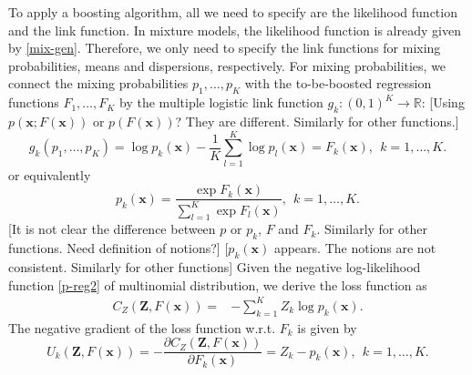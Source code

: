\documentclass[11pt]{article}
\numberwithin{equation}{section}
\def\R{{\mathbb R}}  %
\def\bx{\boldsymbol{x}}
\def\bZ{\boldsymbol{Z}}
\begin{document}
To apply a boosting algorithm, all we need to specify are the likelihood function and the link function.
In mixture models, the likelihood function is already given by \eqref{mix-gen}.
Therefore, we only need to specify the link functions for mixing probabilities, means and dispersions, respectively.
For mixing probabilities, we connect the mixing probabilities $p_1,\ldots,p_K$ with the to-be-boosted regression functions $F_1,\ldots,F_K$ by the multiple logistic link function $g_k:(0,1)^K\rightarrow \R$: {\color{blue}[Using $p(\bx;F(\bx))$ or $p(F(\bx))$? They are different. Similarly for other functions.]}	
	\begin{equation}\label{inv-logistic}
		g_k(p_1,\ldots,p_K)=\log p_k(\bx)-\frac{1}{K}\sum_{l=1}^K\log p_l(\bx)=F_k(\bx),~~k=1,\ldots,K.
\end{equation}
or equivalently
	\begin{equation}\label{logistic}
		p_k(\bx)=\frac{\exp{F_k(\bx)}}{\sum_{l=1}^{K}\exp{F_l(\bx)}},~~k=1,\ldots,K.
	\end{equation}
	 {\color{blue}[It is not clear the difference between $p$ or $p_k$, $F$ and $F_k$. Similarly for other functions. Need definition of notions?]}
{\color{blue}[$p_k(\bx)$ appears. The notions are not consistent. Similarly for other functions]}
Given the negative log-likelihood function \eqref{p-reg2} of multinomial distribution, we derive the loss function as
\begin{equation}
	\begin{aligned}
		{C_{Z}(\bZ, F(\bx))}=& - \sum_{k=1}^K Z_k \log p_k(\bx).
	\end{aligned}
\end{equation}
The negative gradient of the loss function w.r.t. $F_k$ is given by
\begin{equation}
	{U_k(\bZ,F(\bx))}=-\frac{\partial C_{Z}(\bZ,F(\bx))}{\partial F_k(\bx)}=
	Z_k-p_k(\bx), ~~k=1,\ldots,K.
\end{equation}
\end{document}
